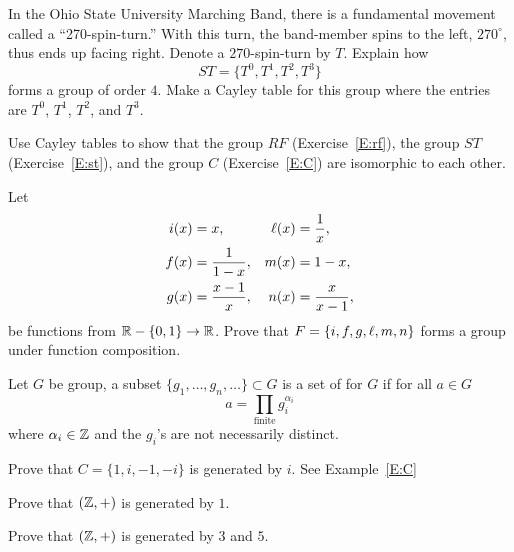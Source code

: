 \documentclass{ximera}
\begin{document}
\begin{exercise}\label{E:st}
  In the Ohio State University Marching Band, there is a fundamental
  movement called a ``270-spin-turn.'' With this turn, the band-member
  spins to the left, $270^\circ$, thus ends up facing right. Denote a
  $270$-spin-turn by $T$. Explain how
  \[
  ST=\{T^0,T^1,T^2,T^3\}
  \]
  forms a group of order $4$. Make a Cayley table for this group where
  the entries are $T^0$, $T^1$, $T^2$, and $T^3$.
\end{exercise}

\begin{exercise}
  Use Cayley tables to show that the group $RF$ (Exercise~\ref{E:rf}),
  the group $ST$ (Exercise~\ref{E:st}), and the group $C$
  (Exercise~\ref{E:C}) are isomorphic to each other.
\end{exercise}



\begin{exercise}\label{E:invg}
  Let
  \begin{align*}
    i(x) &= x,             & \ell(x) &= \frac{1}{x}, \\
    f(x) &= \frac{1}{1-x}, &  m(x) &= 1-x, \\
    g(x) &= \frac{x-1}{x}, &  n(x) &= \frac{x}{x-1},
  \end{align*}
  be functions from $\mathbb R-\{0,1\}\to\mathbb R$.  Prove that $F = \{i,f,g,\ell,m,n\}$
  forms a group under function composition.
\end{exercise}


\begin{definition}
  Let $G$ be group, a subset $\{g_1,\dots, g_n,\dots\}\subset G$ is a
  set of  for $G$ if for all $a\in G$
  \[
  a = \prod_{\mathrm{finite}} g_i^{\alpha_i}
  \]
  where $\alpha_i\in \mathbb Z$ and the $g_i$'s are not necessarily distinct.
\end{definition}


\begin{exercise}
  Prove that $C =\{1,i,-1,-i\}$ is generated by $i$. See Example~\ref{E:C}
\end{exercise}

\begin{exercise}
  Prove that $(\mathbb Z,+)$ is generated by $1$.
\end{exercise}

\begin{exercise}
  Prove that $(\mathbb Z,+)$ is generated by $3$ and $5$.
\end{exercise}
\end{document}
